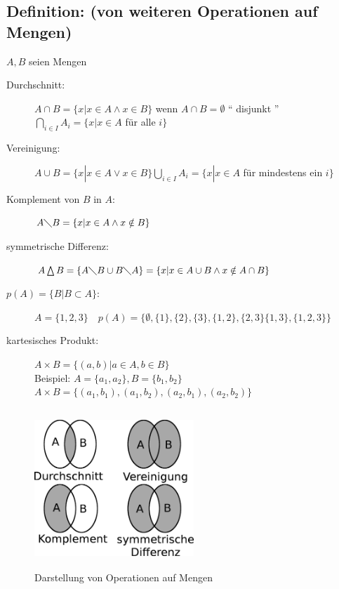 \subsection{Definition: (von weiteren Operationen auf Mengen)}

$A,B$ seien Mengen
\begin{description}
	\item[Durchschnitt: ] $A\cap B = \{x|x\in A \wedge x \in B\}$ wenn $A\cap B = 	
		\emptyset$ "` disjunkt "' $\bigcap_{i \in I}A_{i}=\{x|x \in A$ für alle 
		$i\}$
	\item [Vereinigung: ]$A\cup B = \{x|x\in A \vee x \in B\} \bigcup_{i \in I}A_{i}=\{x|x \in A$ für mindestens ein $i\}$
	\item[Komplement von $B$ in $A$:] $A\diagdown B = \{x|x \in A \wedge x \notin 
		B\}$
	\item[symmetrische Differenz: ] $A \bigtriangleup B = \{A \diagdown B \cup B 
		\diagdown  A\} = \{x|x\in A \cup B \wedge x \notin A\cap B\}$
	\item[$p(A) = \{ B|B\subset A\}$: ] $A = \{1,2,3\} \quad p(A) = \{\emptyset , \{1\},
		\{2\},\{3\},\{1,2\},\{2,3\}\{1,3\},\{1,2,3\}\}$
	\item[kartesisches Produkt: ] $ A\times B = \{(a,b)|a\in A, b\in B\}$\\
		Beispiel: $A=\{a_{1},a_{2}\}, B=\{b_{1}, b_{2}\}$\\
		$A \times B = \{(a_{1},b_{1}),(a_{1},b_{2}),(a_{2},b_{1}),(a_{2},b_{2})\}$
\end{description}

\begin{figure} [H]
\centering 
\includegraphics[width=6cm, height=6cm]{mainmatter/chapter0/pics/durchschnitt.png}
\caption{Darstellung von Operationen auf Mengen} 
\end{figure}
%
%
%
